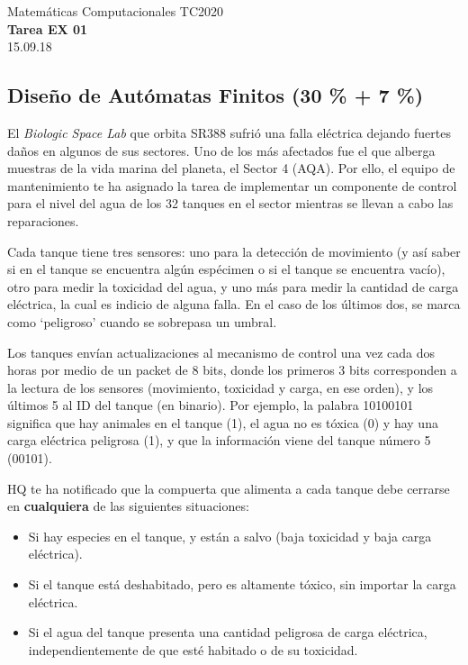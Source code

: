 \documentclass[]{book}
\theoremstyle{definition}
\begin{document}
\begin{center}
{\huge Matemáticas Computacionales TC2020}\\[1.5ex]
{\large \textbf{Tarea EX 01}\\[1.5ex] %
15.09.18} %
\end{center}

\vspace{0.2 cm}

\subsection*{Diseño de Autómatas Finitos (30 \% + 7 \%)}

El \textit{Biologic Space Lab} que orbita \textsc{SR388} sufrió una falla eléctrica dejando fuertes daños en algunos de sus sectores.
Uno de los más afectados fue el que alberga muestras de la vida marina del planeta, el Sector 4 (AQA).
Por ello, el equipo de mantenimiento te ha asignado la tarea de implementar un componente de control para el nivel del agua de los 32 tanques en el sector mientras se llevan a cabo las reparaciones.

Cada tanque tiene tres sensores: uno para la detección de movimiento (y así saber si en el tanque se encuentra algún espécimen o si el tanque se encuentra vacío), otro para medir la toxicidad del agua, y uno más para medir la cantidad de carga eléctrica, la cual es indicio de alguna falla.
En el caso de los últimos dos, se marca como `peligroso' cuando se sobrepasa un umbral.

Los tanques envían actualizaciones al mecanismo de control una vez cada dos horas por medio de un packet de 8 bits, donde los primeros 3 bits corresponden a la lectura de los sensores (movimiento, toxicidad y carga, en ese orden), y los últimos 5 al ID del tanque (en binario). Por ejemplo, la palabra 10100101 significa que hay animales en el tanque (1), el agua no es tóxica (0) y hay una carga eléctrica peligrosa (1), y que la información viene del tanque número 5 (00101).

HQ te ha notificado que la compuerta que alimenta a cada tanque debe cerrarse en \textbf{cualquiera} de las siguientes situaciones:

\begin{itemize}
    \itemsep0em
    \item Si hay especies en el tanque, y están a salvo (baja toxicidad y baja carga eléctrica).
    \item Si el tanque está deshabitado, pero es altamente tóxico, sin importar la carga eléctrica.
    \item Si el agua del tanque presenta una cantidad peligrosa de carga eléctrica, independientemente de que esté habitado o de su toxicidad.
\end{itemize}
\end{document}
